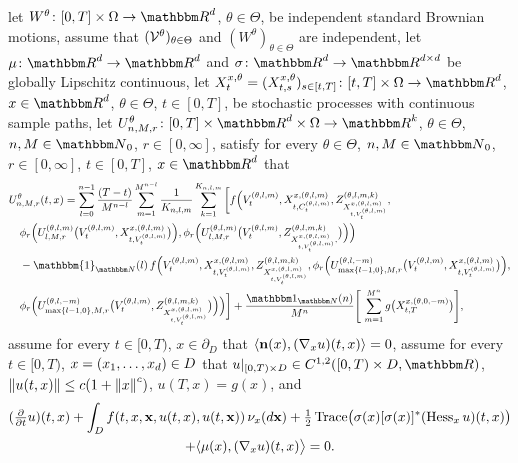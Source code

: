 \begin{algo}
	let $W^\theta\colon [0,T]\times \Omega \rightarrow \R^d$, $\theta \in \Theta$, be independent standard Brownian motions, 
	assume that $({\mathcal{V}}^\theta)_{\theta \in \Theta}$ and $(W^\theta)_{\theta \in \Theta}$ are independent, 
	let $\mu \colon \R^{d} \to \R^{d}$ 
		and $\sigma \colon \R^{d}\to \R^{d\times d}$ be globally Lipschitz continuous, 
	let $X^{x,\theta}_{t} = (X^{x,\theta}_{t,s})_{s\in [t,T]} \colon [t,T] \times  \Omega \rightarrow \R^d$, 
		$x\in \R^{d}$, $\theta \in \Theta$, $t\in [0,T]$, 
		be stochastic processes with continuous sample paths,
	let $U^\theta_{n,M,r}\colon [0,T]\times \R^d\times \Omega \rightarrow \R^k$, 
		$\theta \in \Theta$, 
		$n,M \in \N_0$, 
		$r\in [0,\infty]$, 
		satisfy for every 
		$\theta \in \Theta$,
		$n,M \in \N_0$, 
		$r\in [0,\infty]$, 
		$t\in [0,T]$, 
		$x\in \R^d$ 
		that 
	\begin{equation}
	\label{setting:MLP}
	\begin{split}
		&U^\theta_{n,M,r}(t,x) 
			= \sum_{l=0}^{n-1} \frac{(T-t)}{M^{n-l}}  
				\sum_{m=1}^{M^{n-l}} \frac{1}{K_{n,l,m}}
				\sum_{k=1}^{K_{n,l,m}}
				 \bigg[ f \Big(V_t^{(\theta,l,m)},X^{x,(\theta,l,m)}_{t,C_t^{(\theta,l,m)}},\Zz^{(\theta,l,m,k) }_{ X^{x,(\theta,l,m)}_{t,V_t^{(\theta,l,m)}} },\\
			&\quad \phi_{r}\Big(U^{(\theta,l,m)}_{l,M,r}\big(V_t^{(\theta,l,m)},X^{x,(\theta,l,m)}_{t,V_t^{(\theta,l,m)}}\big)\Big),
			\phi_{r}\Big(U^{(\theta,l,m)}_{l,M,r}\big(V_t^{(\theta,l,m)},\Zz^{(\theta,l,m,k) }_{ X^{x,(\theta,l,m)}_{t,V_t^{(\theta,l,m)}},}\big)\Big)\Big) \\
			&\quad- \mathbbm{1}_\N(l) \, f \Big(V_t^{(\theta,l,m)},X^{x,(\theta,l,m)}_{t,V_t^{(\theta,l,m)}}, \Zz^{(\theta,l,m,k)}_{ X^{x,(\theta,l,m)}_{t,V_t^{(\theta,l,m)}} },
			\phi_{r}\Big(U^{(\theta,l,-m)}_{\max\{l-1,0\},M,r}\big(V_t^{(\theta,l,m)},X^{x,(\theta,l,m)}_{t,V_t^{(\theta,l,m)}}\big)\Big),\\
			&\quad \phi_{r}\Big(U^{(\theta,l,-m)}_{\max\{l-1,0\},M,r}\big(V_t^{(\theta,l,m)},\Zz^{(\theta,l,m,k) }_{ X^{x,(\theta,l,m)}_{t,V_t^{(\theta,l,m)}} }\big)\Big)\Big)\bigg] +  \frac{\one_{\N}(n)}{M^n} \Bigg[ \,\sum_{m=1}^{M^n} g\big(X^{x,(\theta,0,-m)}_{t,T}\big)  \Bigg],
	\end{split}
	\end{equation}
	assume for every 
	$t \in [0,T)$,
	$x \in \partial_D$
	that
	$ \left<{\textbf n}(x) ,(\nabla_x u)(t,x)\right> = 0$,
	assume for every 
		$t\in [0,T)$, 
		$x=(x_{1}, \dots, x_{d}) \in D$
		that 
		$u\vert_{[0,T)\times \D}\in C^{1,2}([0,T)\times \D,\R)$, 
		$\left\| u(t,x) \right\|\leq c(1+\left\| x \right\|^{c})$, 
		$u(T,x) = g(x)$, 
		and
	\begin{multline}\label{setting:PDE}
		(\tfrac{\partial}{\partial t}u)(t,x) + \int_D f (t,x,{\textbf x},u(t,x),u(t,{\textbf x})) \, \nu_x(d{\textbf x}) +\tfrac 12 \operatorname{Trace} \! \big(\sigma(x)[\sigma(x)]^{*}(\operatorname{Hess}_{x} u )(t,x)\big) \\
			+   \langle\mu (x), (\nabla_x u) (t,x)\big\rangle
		=0.
	\end{multline}
	\end{algo}

